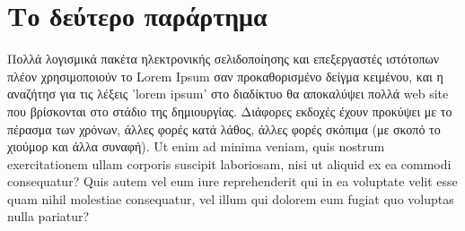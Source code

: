 \chapter{Το δεύτερο παράρτημα}
    Πολλά λογισμικά πακέτα ηλεκτρονικής σελιδοποίησης και επεξεργαστές ιστότοπων πλέον χρησιμοποιούν το Lorem Ipsum σαν
    προκαθορισμένο δείγμα κειμένου, και η αναζήτησ για τις λέξεις 'lorem ipsum' στο διαδίκτυο θα αποκαλύψει πολλά web site
    που βρίσκονται στο στάδιο της δημιουργίας. Διάφορες εκδοχές έχουν προκύψει με το πέρασμα των χρόνων, άλλες φορές κατά
    λάθος, άλλες φορές σκόπιμα (με σκοπό το χιούμορ και άλλα συναφή). Ut enim ad minima veniam, quis
    nostrum exercitationem ullam corporis suscipit laboriosam, nisi ut aliquid ex ea commodi
    consequatur? Quis autem vel eum iure reprehenderit qui in ea voluptate velit esse quam nihil
    molestiae consequatur, vel illum qui dolorem eum fugiat quo voluptas nulla pariatur?